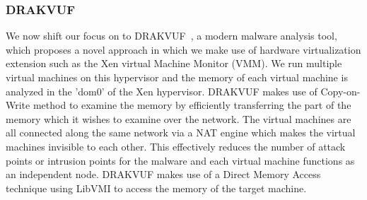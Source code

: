 \documentclass[11pt]{article}
\begin{document}
	\subsubsection{DRAKVUF}
	We now shift our focus on to DRAKVUF~\cite{lengyel2014scalability}, a modern malware analysis tool, which proposes a novel approach in which we make use of hardware virtualization extension such as the Xen virtual Machine Monitor (VMM). We run multiple virtual machines on this hypervisor and the memory of each virtual machine is analyzed in the 'dom0' of the Xen hypervisor. DRAKVUF makes use of Copy-on-Write method to examine the memory by efficiently transferring the part of the memory which it wishes to examine over the network. The virtual machines are all connected along the same network via a NAT engine which makes the virtual machines invisible to each other. This effectively reduces the number of attack points or intrusion points for the malware and each virtual machine functions as an independent node. DRAKVUF makes use of a Direct Memory Access technique using LibVMI to access the memory of the target machine.\\ \\
\end{document}
